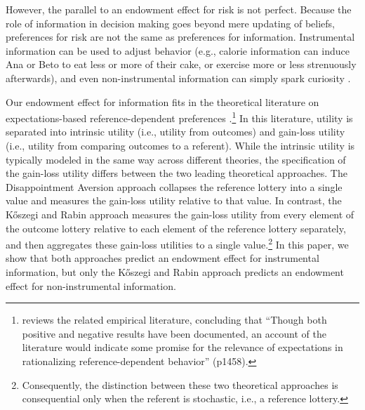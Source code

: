 
However, the parallel to an endowment effect for risk is not perfect. Because the role of information in decision making goes beyond mere updating of beliefs, preferences for risk are not the same as preferences for information. Instrumental information can be used to adjust behavior (e.g., calorie information can induce Ana or Beto to eat less or more of their cake, or exercise more or less strenuously afterwards), and even non-instrumental information can simply spark curiosity \citep{loewensteinPsychologyCuriosityReview1994,sharotHowPeopleDecide2020}.


Our endowment effect for information fits in the theoretical literature on expectations-based reference-dependent preferences \citep{marzilliericsonEndowmentEffect2014,odonoghueChapterReferenceDependentPreferences2018}.\footnote{\citet{sprengerEndowmentEffectRisk2015} reviews the related empirical literature, concluding that \enquote{Though both positive and negative results have been documented, an account of the literature would indicate some promise for the relevance of expectations in rationalizing reference-dependent behavior} (p1458).} In this literature, utility is separated into intrinsic utility (i.e., utility from outcomes) and gain-loss utility (i.e., utility from comparing outcomes to a referent). While the intrinsic utility is typically modeled in the same way across different theories, the specification of the gain-loss utility differs between the two leading theoretical approaches. The Disappointment Aversion approach \citep{bellDisappointmentDecisionMaking1985,loomesDisappointmentDynamicConsistency1986,gulTheoryDisappointmentAversion1991} collapses the reference lottery into a single value and measures the gain-loss utility relative to that value. In contrast, the  Kőszegi and Rabin approach \citep{koszegiModelReferenceDependentPreferences2006,koszegiReferenceDependentRiskAttitudes2007} measures the gain-loss utility from every element of the outcome lottery relative to each element of the reference lottery separately, and then aggregates these gain-loss utilities to a single value.\footnote{Consequently, the distinction between these two theoretical approaches is consequential only when the referent is stochastic, i.e., a reference lottery.}  In this paper, we show that both approaches predict an endowment effect for instrumental information, but only the Kőszegi and Rabin approach predicts an endowment effect for non-instrumental information.

